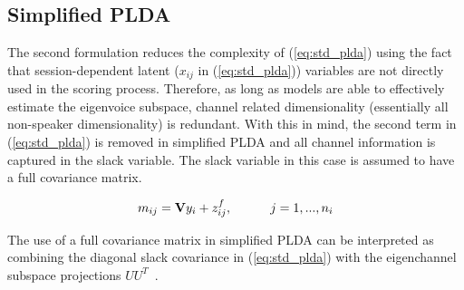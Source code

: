 \documentclass[journal]{IEEEtran}
\begin{document}
\subsection{Simplified PLDA}
\label{ssec:simplified_plda}
The second formulation reduces the complexity of (\ref{eq:std_plda}) using the fact that session-dependent latent ($x_{ij}$ in (\ref{eq:std_plda})) variables are not directly used in the scoring process. 
Therefore, as long as models are able to effectively estimate the eigenvoice subspace, channel related dimensionality (essentially all non-speaker dimensionality) is redundant. 
With this in mind, the second term in (\ref{eq:std_plda}) is removed in simplified PLDA and all channel information is captured in the slack variable. 
The slack variable in this case is assumed to have a full covariance matrix.

\begin{equation}
\label{eq:simple_plda}
m_{ij} = {\bf V}y_i+z^f_{ij},  \hspace{30pt} j=1,...,n_i
\end{equation}

The use of a full covariance matrix in simplified PLDA can be interpreted as combining the diagonal slack covariance in (\ref{eq:std_plda}) with the eigenchannel subspace projections $UU^T$~\cite{sizov2014unifying}.
\end{document}
